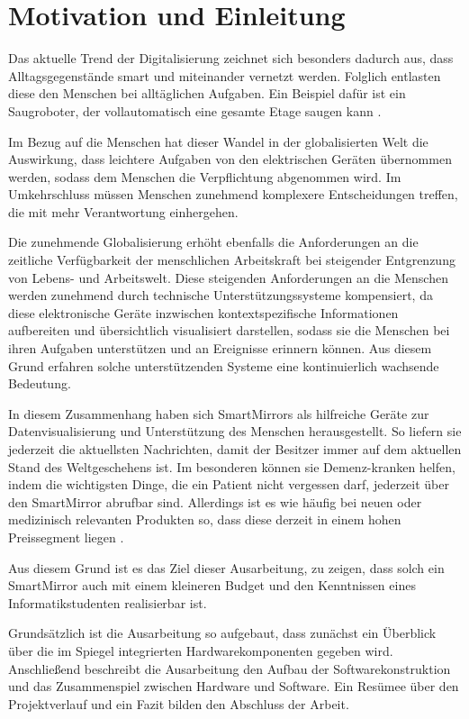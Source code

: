 \chapter{Motivation und Einleitung}
Das aktuelle Trend der Digitalisierung zeichnet sich besonders dadurch aus, dass Alltagsgegenstände smart und miteinander vernetzt werden. Folglich entlasten diese den Menschen bei alltäglichen Aufgaben. Ein Beispiel dafür ist ein Saugroboter, der vollautomatisch eine gesamte Etage saugen kann \cite{irobot2017}.\cite{kagermann2017mobilitatswende}

Im Bezug auf die Menschen hat dieser Wandel in der globalisierten Welt die Auswirkung, dass leichtere Aufgaben von den elektrischen Geräten übernommen werden, sodass dem Menschen die Verpflichtung abgenommen wird. Im Umkehrschluss müssen Menschen zunehmend komplexere Entscheidungen treffen, die mit mehr Verantwortung einhergehen. \cite{Norbisrath:62365}

Die zunehmende Globalisierung erhöht ebenfalls die Anforderungen an die zeitliche Verfügbarkeit der menschlichen Arbeitskraft bei steigender Entgrenzung von Lebens- und Arbeitswelt. Diese steigenden Anforderungen an die Menschen werden zunehmend durch technische Unterstützungssysteme kompensiert, da diese elektronische Geräte inzwischen kontextspezifische Informationen aufbereiten und übersichtlich visualisiert darstellen, sodass sie die Menschen bei ihren Aufgaben unterstützen und an Ereignisse erinnern können. Aus diesem Grund erfahren solche unterstützenden Systeme eine kontinuierlich wachsende Bedeutung.

In diesem Zusammenhang haben sich SmartMirrors als hilfreiche Geräte zur Datenvisualisierung und Unterstützung des Menschen herausgestellt. So liefern sie jederzeit die aktuellsten Nachrichten, damit der Besitzer immer auf dem aktuellen Stand des Weltgeschehens ist. Im besonderen können sie Demenz-kranken helfen, indem die wichtigsten Dinge, die ein Patient nicht vergessen darf, jederzeit über den SmartMirror abrufbar sind. Allerdings ist es wie häufig bei neuen oder medizinisch relevanten Produkten so, dass diese derzeit in einem hohen Preissegment liegen \cite{marketresearch16smartmirror}.

Aus diesem Grund ist es das Ziel dieser Ausarbeitung, zu zeigen, dass solch ein SmartMirror auch mit einem kleineren Budget und den Kenntnissen eines Informatikstudenten realisierbar ist.

Grundsätzlich ist die Ausarbeitung so aufgebaut, dass zunächst ein Überblick über die im Spiegel integrierten Hardwarekomponenten gegeben wird. Anschließend beschreibt die Ausarbeitung den Aufbau der Softwarekonstruktion und das Zusammenspiel zwischen Hardware und Software. Ein Resümee über den Projektverlauf und ein Fazit bilden den Abschluss der Arbeit.



